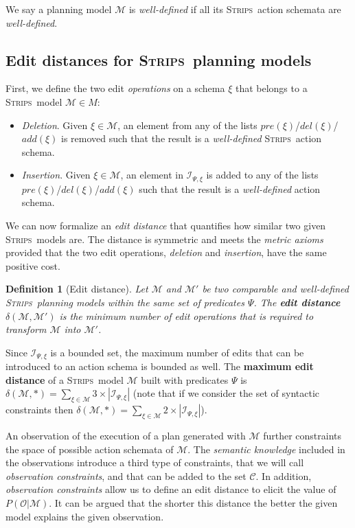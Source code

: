 \documentclass[letterpaper]{article} %
\newcommand{\strips}{\textsc{Strips}}     %
\newtheorem{definition}[theorem]{Definition}
\begin{document}
We say a planning model $\mathcal{M}$ is {\em well-defined} if all its \strips\ action schemata are {\em well-defined}.

\subsection{Edit distances for \strips\ planning models}
First, we define the two edit \emph{operations} on a schema $\xi$ that belongs to a \strips\ model $\mathcal{M}\in M$:

\begin{itemize}
\item {\em Deletion}. Given $\xi\in\mathcal{M}$, an element from any of the lists $pre(\xi)$/$del(\xi)$/$add(\xi)$ is removed such that the result is a {\em well-defined} \strips\ action schema.
\item {\em Insertion}. Given $\xi\in\mathcal{M}$, an element in ${\mathcal I}_{\Psi,\xi}$ is added to any of the lists $pre(\xi)$/$del(\xi)$/$add(\xi)$ such that the result is a {\em well-defined} action schema.
\end{itemize}

We can now formalize an {\em edit distance} that quantifies how similar two given \strips\ models are. The distance is symmetric and meets the {\em metric axioms} provided that the two edit operations, {\em deletion} and {\em insertion}, have the same positive cost.

\begin{definition}[Edit distance]
  Let $\mathcal{M}$ and $\mathcal{M}'$ be two {\em comparable} and {\em well-defined} \strips\ planning models within the same set of predicates $\Psi$. The {\bf edit distance} $\delta(\mathcal{M},\mathcal{M}')$ is the minimum number of {\em edit operations} that is required to transform $\mathcal{M}$ into $\mathcal{M}'$.
\end{definition}

Since ${\mathcal I}_{\Psi,\xi}$ is a bounded set, the maximum number of edits that can be introduced to an action schema is bounded as well. The \textbf{maximum edit distance} of a \strips\ model $\mathcal{M}$ built with predicates $\Psi$ is $\delta(\mathcal{M},*)=\sum_{\xi\in\mathcal{M}} 3\times|{\mathcal I}_{\Psi,\xi}|$ (note that if we consider the set of syntactic constraints then $\delta(\mathcal{M},*)=\sum_{\xi\in\mathcal{M}} 2\times|{\mathcal I}_{\Psi,\xi}|$).

\vspace{0.02cm}

An observation of the execution of a plan generated with $\mathcal{M}$ further constraints the space of possible action schemata of $\mathcal{M}$. The \emph{semantic knowledge} included in the observations introduce a third type of constraints, that we will call {\em observation constraints}, and that can be added to the set $\mathcal{C}$. In addition, {\em observation constraints} allow us to define an edit distance to elicit the value of $P(\mathcal{O}|\mathcal{M})$. It can be argued that the shorter this distance the better the given model explains the given observation.
\end{document}
